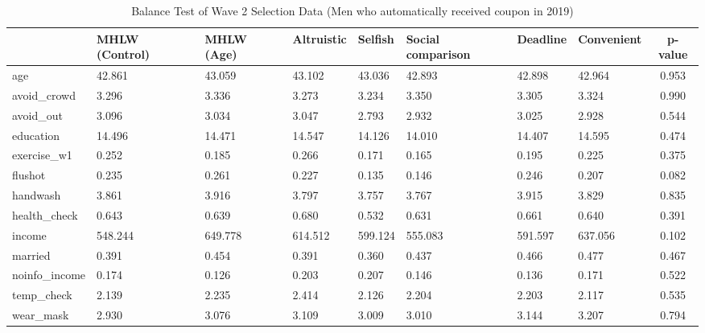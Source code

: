 \begin{table}[!h]

\caption{Balance Test of Wave 2 Selection Data (Men who automatically received coupon in 2019) \label{tab:act-coupon1-balance}}
\centering
\begin{tabular}[t]{l>{\centering\arraybackslash}p{3em}>{\centering\arraybackslash}p{3em}>{\centering\arraybackslash}p{3em}>{\centering\arraybackslash}p{3em}>{\centering\arraybackslash}p{3em}>{\centering\arraybackslash}p{3em}>{\centering\arraybackslash}p{3em}c}
\toprule
  & MHLW (Control) & MHLW (Age) & Altruistic & Selfish & Social comparison & Deadline & Convenient & p-value\\
\midrule
age & \num{42.861} & \num{43.059} & \num{43.102} & \num{43.036} & \num{42.893} & \num{42.898} & \num{42.964} & \num{0.953}\\
avoid\_crowd & \num{3.296} & \num{3.336} & \num{3.273} & \num{3.234} & \num{3.350} & \num{3.305} & \num{3.324} & \num{0.990}\\
avoid\_out & \num{3.096} & \num{3.034} & \num{3.047} & \num{2.793} & \num{2.932} & \num{3.025} & \num{2.928} & \num{0.544}\\
education & \num{14.496} & \num{14.471} & \num{14.547} & \num{14.126} & \num{14.010} & \num{14.407} & \num{14.595} & \num{0.474}\\
exercise\_w1 & \num{0.252} & \num{0.185} & \num{0.266} & \num{0.171} & \num{0.165} & \num{0.195} & \num{0.225} & \num{0.375}\\
flushot & \num{0.235} & \num{0.261} & \num{0.227} & \num{0.135} & \num{0.146} & \num{0.246} & \num{0.207} & \num{0.082}\\
handwash & \num{3.861} & \num{3.916} & \num{3.797} & \num{3.757} & \num{3.767} & \num{3.915} & \num{3.829} & \num{0.835}\\
health\_check & \num{0.643} & \num{0.639} & \num{0.680} & \num{0.532} & \num{0.631} & \num{0.661} & \num{0.640} & \num{0.391}\\
income & \num{548.244} & \num{649.778} & \num{614.512} & \num{599.124} & \num{555.083} & \num{591.597} & \num{637.056} & \num{0.102}\\
married & \num{0.391} & \num{0.454} & \num{0.391} & \num{0.360} & \num{0.437} & \num{0.466} & \num{0.477} & \num{0.467}\\
noinfo\_income & \num{0.174} & \num{0.126} & \num{0.203} & \num{0.207} & \num{0.146} & \num{0.136} & \num{0.171} & \num{0.522}\\
temp\_check & \num{2.139} & \num{2.235} & \num{2.414} & \num{2.126} & \num{2.204} & \num{2.203} & \num{2.117} & \num{0.535}\\
wear\_mask & \num{2.930} & \num{3.076} & \num{3.109} & \num{3.009} & \num{3.010} & \num{3.144} & \num{3.207} & \num{0.794}\\
\bottomrule
\end{tabular}
\end{table}
